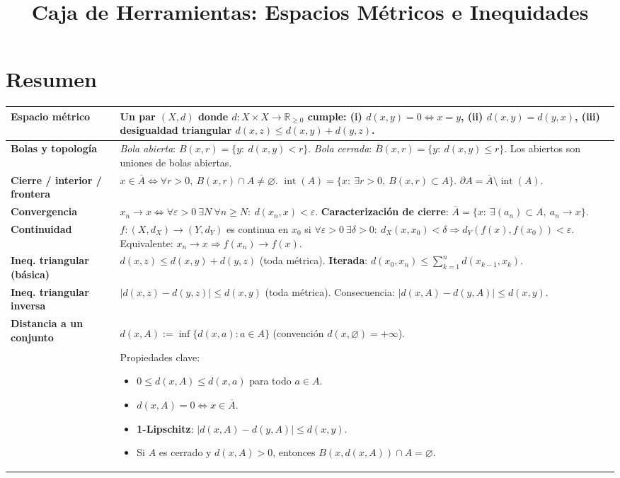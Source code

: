 \documentclass[12pt]{article}
\title{Caja de Herramientas: Espacios Métricos e Inequidades}
\author{}
\date{}
\begin{document}
\maketitle

\section*{Resumen}

\begin{tabular}{|L{4.3cm}|L{11.5cm}|}
\hline
\textbf{Espacio métrico} &
Un par \((X,d)\) donde \(d:X\times X\to\mathbb{R}_{\ge 0}\) cumple:
(i) \(d(x,y)=0\iff x=y\),
(ii) \(d(x,y)=d(y,x)\),
(iii) \textbf{desigualdad triangular} \(d(x,z)\le d(x,y)+d(y,z)\).
\\
\hline

\textbf{Bolas y topología} &
\textit{Bola abierta}: \(B(x,r)=\{y:\ d(x,y)<r\}\).
\; \textit{Bola cerrada}: \(\overline{B}(x,r)=\{y:\ d(x,y)\le r\}\).
\; Los abiertos son uniones de bolas abiertas.
\\
\hline

\textbf{Cierre / interior / frontera} &
\(x\in\overline{A}\iff \forall r>0,\ B(x,r)\cap A\neq\varnothing\).
\; \(\operatorname{int}(A)=\{x:\ \exists r>0,\ B(x,r)\subset A\}\).
\; \(\partial A=\overline{A}\setminus \operatorname{int}(A)\).
\\
\hline

\textbf{Convergencia} &
\(x_n\to x \iff \forall\varepsilon>0\ \exists N\ \forall n\ge N:\ d(x_n,x)<\varepsilon\).
\; \textbf{Caracterización de cierre}: \(\overline{A}=\{x:\ \exists (a_n)\subset A,\ a_n\to x\}\).
\\
\hline

\textbf{Continuidad} &
\(f:(X,d_X)\to(Y,d_Y)\) es continua en \(x_0\) si
\(\forall\varepsilon>0\ \exists\delta>0:\ d_X(x,x_0)<\delta\Rightarrow d_Y(f(x),f(x_0))<\varepsilon\).
\; Equivalente: \(x_n\to x\Rightarrow f(x_n)\to f(x)\).
\\
\hline

\textbf{Ineq. triangular (básica)} &
\(d(x,z)\le d(x,y)+d(y,z)\) (toda métrica).
\; \textbf{Iterada}: \(d(x_0,x_n)\le \sum_{k=1}^n d(x_{k-1},x_k)\).
\\
\hline

\textbf{Ineq. triangular inversa} &
\(\lvert d(x,z)-d(y,z)\rvert\le d(x,y)\) (toda métrica).
\; Consecuencia: \(\lvert d(x,A)-d(y,A)\rvert\le d(x,y)\).
\\
\hline

\textbf{Distancia a un conjunto} &
\(d(x,A):=\inf\{d(x,a):a\in A\}\) (convención \(d(x,\varnothing)=+\infty\)).
\par
Propiedades clave:
\begin{itemize}
\item \(0\le d(x,A)\le d(x,a)\) para todo \(a\in A\).
\item \(d(x,A)=0\iff x\in\overline{A}\).
\item \textbf{1-Lipschitz}: \(|d(x,A)-d(y,A)|\le d(x,y)\).
\item Si \(A\) es cerrado y \(d(x,A)>0\), entonces \(B(x,d(x,A))\cap A=\varnothing\).
\end{itemize}
\\
\hline


\end{tabular}
\end{document}
